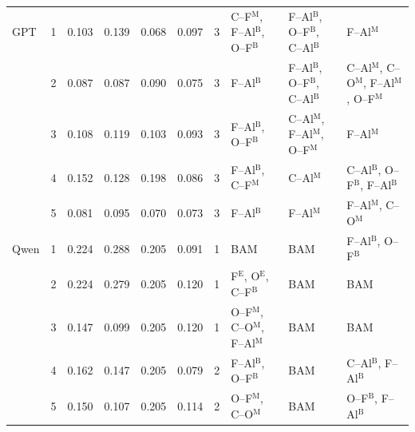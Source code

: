 \begin{table}[h]
\begin{tabular}{llrrrrrlll}
GPT & 1 & 0.103 & 0.139 & 0.068 & 0.097 & 3 & C--F$^\mathrm{M}$, F--Al$^\mathrm{B}$, O--F$^\mathrm{B}$ & F--Al$^\mathrm{B}$, O--F$^\mathrm{B}$, C--Al$^\mathrm{B}$ & F--Al$^\mathrm{M}$ \\
 & 2 & 0.087 & 0.087 & 0.090 & 0.075 & 3 & F--Al$^\mathrm{B}$ & F--Al$^\mathrm{B}$, O--F$^\mathrm{B}$, C--Al$^\mathrm{B}$ & C--Al$^\mathrm{M}$, C--O$^\mathrm{M}$, F--Al$^\mathrm{M}$, O--F$^\mathrm{M}$ \\
 & 3 & 0.108 & 0.119 & 0.103 & 0.093 & 3 & F--Al$^\mathrm{B}$, O--F$^\mathrm{B}$ & C--Al$^\mathrm{M}$, F--Al$^\mathrm{M}$, O--F$^\mathrm{M}$ & F--Al$^\mathrm{M}$ \\
 & 4 & 0.152 & 0.128 & 0.198 & 0.086 & 3 & F--Al$^\mathrm{B}$, C--F$^\mathrm{M}$ & C--Al$^\mathrm{M}$ & C--Al$^\mathrm{B}$, O--F$^\mathrm{B}$, F--Al$^\mathrm{B}$ \\
 & 5 & 0.081 & 0.095 & 0.070 & 0.073 & 3 & F--Al$^\mathrm{B}$ & F--Al$^\mathrm{M}$ & F--Al$^\mathrm{M}$, C--O$^\mathrm{M}$ \\
Qwen & 1 & 0.224 & 0.288 & 0.205 & 0.091 & 1 & BAM & BAM & F--Al$^\mathrm{B}$, O--F$^\mathrm{B}$ \\
 & 2 & 0.224 & 0.279 & 0.205 & 0.120 & 1 & F$^\mathrm{E}$, O$^\mathrm{E}$, C--F$^\mathrm{B}$ & BAM & BAM \\
 & 3 & 0.147 & 0.099 & 0.205 & 0.120 & 1 & O--F$^\mathrm{M}$, C--O$^\mathrm{M}$, F--Al$^\mathrm{M}$ & BAM & BAM \\
 & 4 & 0.162 & 0.147 & 0.205 & 0.079 & 2 & F--Al$^\mathrm{B}$, O--F$^\mathrm{B}$ & BAM & C--Al$^\mathrm{B}$, F--Al$^\mathrm{B}$ \\
 & 5 & 0.150 & 0.107 & 0.205 & 0.114 & 2 & O--F$^\mathrm{M}$, C--O$^\mathrm{M}$ & BAM & O--F$^\mathrm{B}$, F--Al$^\mathrm{B}$ \\
\bottomrule
\end{tabular}
\end{table}

